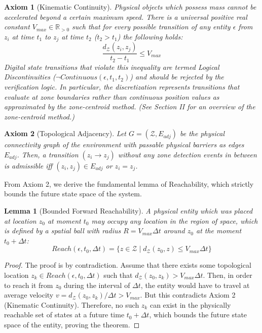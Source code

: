 \documentclass[conference]{IEEEtran}
\newtheorem{lemma}{Lemma}
\newtheorem{axiom}{Axiom}
\newcommand{\Z}{\mathcal{Z}} %
\begin{document}
\begin{axiom}[Kinematic Continuity]
Physical objects which possess mass cannot be accelerated beyond a certain maximum speed. There is a universal positive real constant $V_{max} \in \mathbb{R}_{>0}$ such that for every possible transition of any entity $\epsilon$ from $z_i$ at time $t_1$ to $z_j$ at time $t_2$ ($t_2 > t_1$) the following holds:
\begin{equation}
\frac{d_\Z(z_i, z_j)}{t_2 - t_1} \le V_{max}
\end{equation}
Digital state transitions that violate this inequality are termed Logical Discontinuities ($\neg Continuous(\epsilon, t_1, t_2)$) and should be rejected by the verification logic. In particular, the discretization represents transitions that evaluate at zone boundaries rather than continuous position values as approximated by the zone-centroid method. (See Section II for an overview of the zone-centroid method.)
\end{axiom}

\begin{axiom}[Topological Adjacency]
Let $G = (\Z, E_{adj})$ be the physical connectivity graph of the environment with passable physical barriers as edges $E_{adj}$. Then, a transition $(z_i \to z_j)$ without any zone detection events in between is admissible iff $(z_i, z_j) \in E_{adj}$ or $z_i = z_j$.
\end{axiom}

From Axiom 2, we derive the fundamental lemma of Reachability, which strictly bounds the future state space of the system.



\begin{lemma}[Bounded Forward Reachability]
A physical entity which was placed at location $z_0$ at moment $t_0$ may occupy any location in the region of space, which is defined by a spatial ball with radius $R = V_{max}\Delta t$ around $z_0$ at the moment $t_0+\Delta t$:
\begin{equation}
Reach(\epsilon, t_0, \Delta t) = \{ z \in \Z \mid d_\Z(z_0, z) \le V_{max} \Delta t \}
\end{equation}
\end{lemma}
\begin{proof}
The proof is by contradiction. Assume that there exists some topological location $z_k \in Reach(\epsilon, t_0, \Delta t)$ such that $d_\Z(z_0, z_k) > V_{max} \Delta t$. Then, in order to reach it from $z_0$ during the interval of $\Delta t$, the entity would have to travel at average velocity $v = d_\Z(z_0, z_k) / \Delta t > V_{max}$. But this contradicts Axiom 2 (Kinematic Continuity). Therefore, no such $z_k$ can exist in the physically reachable set of states at a future time $t_0 + \Delta t$, which bounds the future state space of the entity, proving the theorem.
\end{proof}
\end{document}
